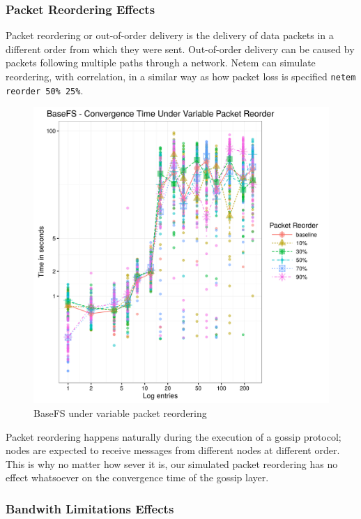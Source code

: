 \documentclass{sig-alternate}
\begin{document}
\subsubsection{Packet Reordering Effects}
Packet reordering or out-of-order delivery is the delivery of data packets in a different order from which they were sent. Out-of-order delivery can be caused by packets following multiple paths through a network. Netem can simulate reordering, with correlation, in a similar way as how packet loss is specified \texttt{netem reorder 50\% 25\%}.


\begin{figure}[htp]
\centering
\includegraphics[width=\columnwidth]{../eval/plots/basefs-reorder.png}
\caption{BaseFS under variable packet reordering}
\label{fig:basefs-reorder}
\end{figure}

Packet reordering happens naturally during the execution of a gossip protocol; nodes are expected to receive messages from different nodes at different order. This is why no matter how sever it is, our simulated packet reordering has no effect whatsoever on the convergence time of the gossip layer.

\subsubsection{Bandwith Limitations Effects}
\end{document}
